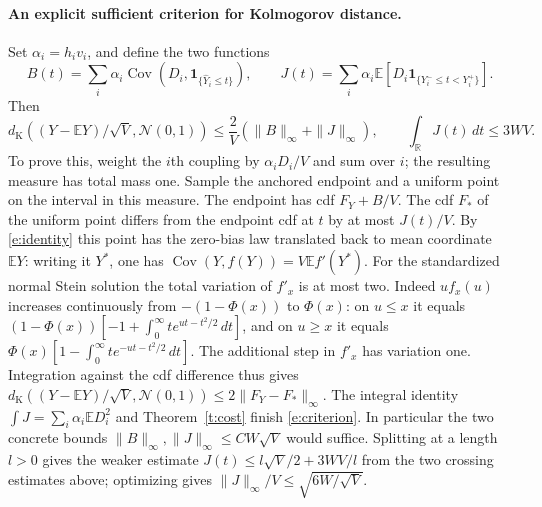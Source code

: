 \documentclass[11pt]{article}
\newcommand{\E}{\mathbb E}
\newcommand{\Cov}{\operatorname{Cov}}
\newcommand{\ind}{\mathbf1}
\newcommand{\dK}{d_{\mathrm K}}
\newcommand{\Nlaw}{\mathcal N(0,1)}
\numberwithin{equation}{section}
\begin{document}
\paragraph{An explicit sufficient criterion for Kolmogorov distance.}
Set $\alpha_i=h_iv_i$, and define the two functions
\[
 B(t)=\sum_i\alpha_i\Cov(D_i,\ind_{\{\widehat Y_i\le t\}}),\qquad
 J(t)=\sum_i\alpha_i\E[D_i\ind_{\{Y_i^-\le t<Y_i^+\}}].
\]
Then
\begin{equation}\label{e:criterion}
 \dK((Y-\E Y)/\sqrt V,\Nlaw)\le \frac{2}{V}
                  (\|B\|_\infty+\|J\|_\infty),\qquad
 \int_{\mathbb R}J(t)\,dt\le3WV .
\end{equation}
To prove this, weight the $i$th coupling by $\alpha_iD_i/V$ and sum over $i$;
the resulting measure has total mass one. Sample the anchored endpoint and a uniform
point on the interval in this measure. The endpoint has cdf $F_Y+B/V$. The cdf
$F_*$ of the uniform point differs from the endpoint cdf at $t$ by at most $J(t)/V$.
By \eqref{e:identity} this point has the zero-bias law translated back to mean
coordinate $\E Y$: writing it $Y^*$, one has $\Cov(Y,f(Y))=V\E f'(Y^*)$.
For the standardized normal Stein solution the total variation of $f'_x$ is at
most two. Indeed $u f_x(u)$ increases continuously from $-(1-\Phi(x))$ to $\Phi(x)$:
on $u\le x$ it equals $(1-\Phi(x))[-1+\int_0^\infty t e^{ut-t^2/2}\,dt]$,
and on $u\ge x$ it equals $\Phi(x)[1-\int_0^\infty t e^{-ut-t^2/2}\,dt]$.
The additional step in $f'_x$ has variation one. Integration against the cdf
difference thus gives $\dK((Y-\E Y)/\sqrt V,\Nlaw)\le2\|F_Y-F_*\|_\infty$.
The integral identity $\int J=\sum_i\alpha_i\E D_i^2$ and Theorem~\ref{t:cost}
finish \eqref{e:criterion}.
In particular the two concrete bounds $\|B\|_\infty,\|J\|_\infty\le CW\sqrt V$
would suffice. Splitting at a length $l>0$ gives the weaker estimate
$J(t)\le l\sqrt V/2+3WV/l$ from the two crossing estimates above; optimizing gives
$\|J\|_\infty/V\le\sqrt{6W/\sqrt V}$.
\end{document}

